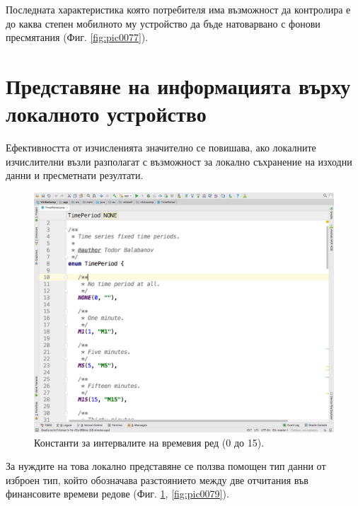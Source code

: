 \documentclass[book,14pt,oneside,openany]{memoir}
\begin{document}
Последната характеристика която потребителя има възможност да контролира е до каква степен мобилното му устройство да бъде натоварвано с фонови пресмятания (Фиг. \ref{fig:pic0077}).

\section{Представяне на информацията върху локалното устройство}

Ефективността от изчисленията значително се повишава, ако локалните изчислителни възли разполагат с възможност за локално съхранение на изходни данни и пресметнати резултати. 

\begin{figure}[h]
  \centering
  \includegraphics[height=0.45\pdfpageheight]{pic0078}
  \caption{Константи за интервалите на времевия ред (0 до 15).}
\label{fig:pic0078}
\end{figure}
\FloatBarrier

За нуждите на това локално представяне се ползва помощен тип данни от изброен тип, който обозначава разстоянието между две отчитания във финансовите времеви редове (Фиг. \ref{fig:pic0078}, \ref{fig:pic0079}).
\end{document}
